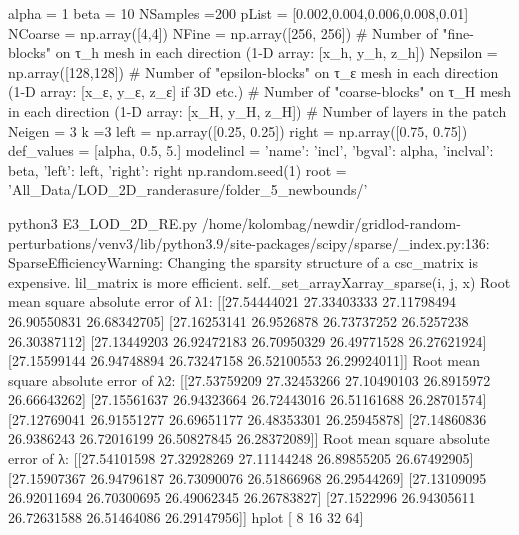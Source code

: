 alpha = 1
beta = 10
NSamples =200
pList = [0.002,0.004,0.006,0.008,0.01]
NCoarse = np.array([4,4])
NFine = np.array([256, 256])   # Number of "fine-blocks" on τ_h mesh in each direction (1-D array: [x_h, y_h, z_h])
Nepsilon = np.array([128,128])    # Number of "epsilon-blocks" on τ_ε mesh in each direction (1-D array: [x_ε, y_ε, z_ε] if 3D etc.)     # Number of "coarse-blocks" on τ_H mesh in each direction (1-D array: [x_H, y_H, z_H]) # Number of layers in the patch 
Neigen = 3
k =3
left = np.array([0.25, 0.25])
right = np.array([0.75, 0.75])
def_values = [alpha, 0.5, 5.]
modelincl = {'name': 'incl', 'bgval': alpha, 'inclval': beta, 'left': left, 'right': right}
np.random.seed(1)
root = 'All_Data/LOD_2D_randerasure/folder_5_newbounds/'


python3 E3_LOD_2D_RE.py
/home/kolombag/newdir/gridlod-random-perturbations/venv3/lib/python3.9/site-packages/scipy/sparse/_index.py:136: SparseEfficiencyWarning: Changing the sparsity structure of a csc_matrix is expensive. lil_matrix is more efficient.
  self._set_arrayXarray_sparse(i, j, x)
Root mean square absolute error of λ1:
 [[27.54444021 27.33403333 27.11798494 26.90550831 26.68342705]
 [27.16253141 26.9526878  26.73737252 26.5257238  26.30387112]
 [27.13449203 26.92472183 26.70950329 26.49771528 26.27621924]
 [27.15599144 26.94748894 26.73247158 26.52100553 26.29924011]]
Root mean square absolute error of λ2: 
 [[27.53759209 27.32453266 27.10490103 26.8915972  26.66643262]
 [27.15561637 26.94323664 26.72443016 26.51161688 26.28701574]
 [27.12769041 26.91551277 26.69651177 26.48353301 26.25945878]
 [27.14860836 26.9386243  26.72016199 26.50827845 26.28372089]]
Root mean square absolute error of λ: 
 [[27.54101598 27.32928269 27.11144248 26.89855205 26.67492905]
 [27.15907367 26.94796187 26.73090076 26.51866968 26.29544269]
 [27.13109095 26.92011694 26.70300695 26.49062345 26.26783827]
 [27.1522996  26.94305611 26.72631588 26.51464086 26.29147956]]
hplot [ 8 16 32 64]